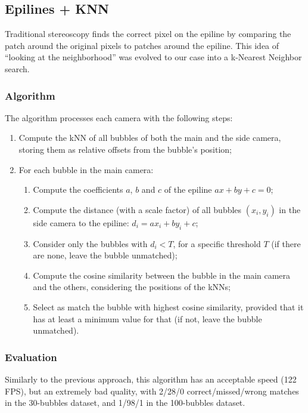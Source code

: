 \subsection{Epilines + KNN}
\label{sec:match:epi-knn}

Traditional stereoscopy finds the correct pixel on the epiline by comparing the patch around the original pixels to patches around the epiline.
This idea of ``looking at the neighborhood'' was evolved to our case into a k-Nearest Neighbor search.

\subsubsection{Algorithm}

The algorithm processes each camera with the following steps:
\begin{enumerate}
	\itemsep 0em
	\item Compute the kNN of all bubbles of both the main and the side camera, storing them as relative offsets from the bubble's position;
	\item For each bubble in the main camera:
	      \begin{enumerate}
		      \item Compute the coefficients $a$, $b$ and $c$ of the epiline $ax+by+c{=}0$;
		      \item Compute the distance (with a scale factor) of all bubbles $(x_i, y_i)$ in the side camera to the epiline: $d_i = ax_i + by_i + c$;
		      \item Consider only the bubbles with $d_i<T$, for a specific threshold $T$ (if there are none, leave the bubble unmatched);
		      \item Compute the cosine similarity between the bubble in the main camera and the others, considering the positions of the kNNs;
		      \item Select as match the bubble with highest cosine similarity, provided that it has at least a minimum value for that (if not, leave the bubble unmatched).
	      \end{enumerate}
\end{enumerate}

\subsubsection{Evaluation}

Similarly to the previous approach, this algorithm has an acceptable speed (122 FPS), but an extremely bad quality, with 2/28/0 correct/missed/wrong matches in the 30-bubbles dataset, and 1/98/1 in the 100-bubbles dataset.
